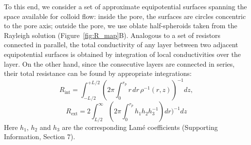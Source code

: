 \documentclass[12pt, a4paper]{article}
\begin{document}
To this end, we consider a set of approximate equipotential surfaces spanning the space available for colloid flow: inside the pore, the surfaces are circles concentric to the pore axis; outside the pore, we use oblate half-spheroids taken from the Rayleigh solution \cite{Strutt1878} (Figure~\ref{fig:R_map}B).
Analogous to a set of resistors connected in parallel, the total conductivity of any layer between two adjacent equipotential surfaces is obtained by integration of local conductivities over the layer. On the other hand, since the consecutive layers are connected in series, their total resistance can be found by appropriate integrations:
\begin{equation}
    R_{\text{int}} = \int_{-L_{}/2}^{+L_{}/2}\left(2\pi\int_{0}^{r_{\text{p}}^{}} r \, dr \, \rho^{-1}(r, z)\right)^{-1} dz,
    \label{eq:R_pore}
\end{equation}
$$
    R_{\text{ext}} = 2\int_{L/2}^{\infty} (2\pi\int_{0}^{r_p}h_1h_2h_{3}^{-1})dr)^{-1}dz
$$
Here $h_1$, $h_2$ and $h_3$ are the corresponding Lam\'e coefficients (Supporting Information, Section 7).


\end{document}
